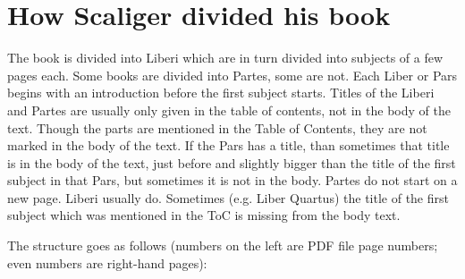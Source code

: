 \documentclass{report}
\begin{document}
\chapter{How Scaliger divided his book}
The book is divided into Liberi which are in turn divided into subjects of
a few pages each. Some books are divided into Partes, some are not.
Each Liber or Pars begins with an introduction before the first subject starts. 
Titles of the Liberi and Partes are usually only given in the table of
contents, not in the body of the text. Though the parts are mentioned in the
Table of Contents, they are not marked in the body of the text.
If the Pars has a title, than sometimes that title is in the body of the text,
just before and slightly bigger than the title of the first subject in that
Pars, but sometimes it is not in the body. Partes do not start on a new page.
Liberi usually do. Sometimes (e.g. Liber Quartus) the title of the first
subject which was mentioned in the ToC is missing from the body text.

The structure goes as follows (numbers on the left are PDF file page numbers;
even numbers are right-hand pages):
\end{document}
